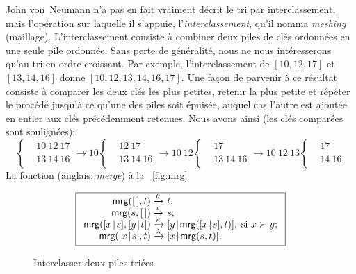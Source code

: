 John von~Neumann n'a pas en fait vraiment décrit le tri par
interclassement, mais l'opération sur laquelle il s'appuie,
l'\emph{interclassement}, qu'il nomma \emph{meshing}
(maillage). L'interclassement consiste à combiner deux piles de clés
ordonnées en une seule pile ordonnée. Sans perte de généralité, nous
ne nous intéresserons qu'au tri en ordre croissant. Par exemple,
l'interclassement de \([10,12,17]\) et \([13,14,16]\) donne
\([10,12,13,14,16,17]\). Une façon de parvenir à ce résultat consiste
à comparer les deux clés les plus petites, retenir la plus petite et
répéter le procédé jusqu'à ce qu'une des piles soit épuisée, auquel
cas l'autre est ajoutée en entier aux clés précédemment retenues. Nous
avons ainsi (les clés comparées sont soulignées):
\begin{equation*}
\left\{
\begin{aligned}
&\underline{10}~12~17\\
&\underline{13}~14~16
\end{aligned}
\right.
\rightarrow 10
\left\{
\begin{aligned}
&\underline{12}~17\\
&\underline{13}~14~16
\end{aligned}
\right.
\rightarrow 10~12
\left\{
\begin{aligned}
&\underline{17}\\
&\underline{13}~14~16
\end{aligned}
\right.
\rightarrow 10~12~13
\left\{
\begin{aligned}
&\underline{17}\\
&\underline{14}~16
\end{aligned}
\right.
\end{equation*}
La fonction  (anglais: \emph{merge})
à la \fig~\vref{fig:mrg}
\begin{figure}[b]
\begin{equation*}
\boxed{%
\begin{array}{r@{\;}l@{\;}l}
\fun{mrg}(\el,t)         & \xrightarrow{\smash{\theta}} & t;\\
\fun{mrg}(s,\el)         & \xrightarrow{\smash{\iota}} & s;\\
\fun{mrg}(\cons{x}{s},\cons{y}{t}) & \xrightarrow{\smash{\kappa}}
& \cons{y}{\fun{mrg}(\cons{x}{s},t)},\;\text{si \(x \succ y\)};\\
\fun{mrg}(\cons{x}{s},t) & \xrightarrow{\smash{\lambda}}
                         & \cons{x}{\fun{mrg}(s,t)}.
\end{array}}
\end{equation*}
\caption{Interclasser deux piles triées}
\label{fig:mrg}
\end{figure}
